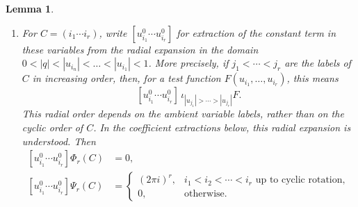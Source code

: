 \documentclass[11pt,a4paper]{amsart}
\numberwithin{equation}{section}
\newtheorem{lemma}[theorem]{Lemma}
\theoremstyle{definition}
\theoremstyle{remark}
\DeclareMathOperator*{\Res}{Res}
\newcommand{\ii}{i}
\newcommand{\dd}{\mathrm d}
\begin{document}
\begin{lemma}
\begin{enumerate}[label=\textup{(\roman*)},leftmargin=2.7em]

 \item For $C=(i_1\cdots i_r)$, write
 $[u_{i_1}^0\cdots u_{i_r}^0]$ for extraction of the constant term
 in these variables from the radial expansion in the domain $  0 < |q| < |u_{i_n}| < \dots < |u_{i_1}| < 1 $.
 More precisely, if $j_1<\cdots<j_r$ are the labels of $C$ in increasing
 order, then, for a test function $F(u_{i_1},\ldots,u_{i_r})$, this means
 \[
 [u_{i_1}^0\cdots u_{i_r}^0]\,
 \iota_{|u_{j_1}|>\cdots>|u_{j_r}|}F.
 \]
 This radial order depends on the ambient variable labels, rather than
 on the cyclic order of $C$. In the coefficient extractions below,
 this radial expansion is understood. Then
 \begin{equation}
 \begin{aligned}
  [u_{i_1}^0\cdots u_{i_r}^0]\Phi_r(C)&=0,\\
  [u_{i_1}^0\cdots u_{i_r}^0]\Psi_r(C)&=
  \begin{cases}
   (2\pi\ii)^r,& i_1<i_2<\cdots<i_r \text{ up to cyclic rotation},\\
   0,&\text{otherwise}.
  \end{cases}
 \end{aligned}
  \label{eq:kernel-constant-terms}
 \end{equation}
\end{enumerate}
\end{lemma}
\end{document}
